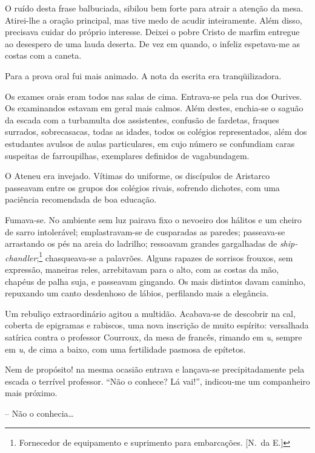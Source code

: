 O ruído desta frase balbuciada,
sibilou bem forte para atrair a atenção da mesa. Atirei{}-lhe a oração
principal, mas tive medo de acudir inteiramente. Além disso, precisava
cuidar do próprio interesse. Deixei o pobre Cristo de marfim entregue
ao desespero de uma lauda deserta. De vez em quando, o infeliz
espetava{}-me as costas com a caneta. 

Para a prova oral fui mais
animado. A nota da escrita era tranqüilizadora. 

Os exames orais eram
todos nas salas de cima. Entrava{}-se pela rua dos Ourives. Os
examinandos estavam em geral mais calmos. Além destes, enchia{}-se o
saguão da escada com a turbamulta dos assistentes, confusão de
fardetas, fraques surrados, sobrecasacas, todas as idades, todos os
colégios representados, além dos estudantes avulsos de aulas
particulares, em cujo número se confundiam caras suspeitas de
farroupilhas, exemplares definidos de vagabundagem. 

O Ateneu era
invejado. Vítimas do uniforme, os discípulos de Aristarco passeavam
entre os grupos dos colégios rivais, sofrendo dichotes, com uma
paciência recomendada de boa educação. 

Fumava{}-se. No ambiente sem luz
pairava fixo o nevoeiro dos hálitos e um cheiro de sarro intolerável;
emplastravam{}-se de cusparadas as paredes; passeava{}-se arrastando os
pés na areia do ladrilho; ressoavam grandes gargalhadas de
\textit{ship{}-chandler};\footnote{ Fornecedor de equipamento e suprimento para embarcações. [N.~da E.]} 
chasqueava{}-se a palavrões. Alguns rapazes de sorrisos 
frouxos, sem expressão, maneiras reles, arrebitavam
para o alto, com as costas da mão, chapéus de palha suja, e passeavam
gingando. Os mais distintos davam caminho, repuxando um canto
desdenhoso de lábios, perfilando mais a elegância. 

Um rebuliço
extraordinário agitou a multidão. Acabava{}-se de descobrir na cal,
coberta de epigramas e rabiscos, uma nova inscrição de muito espírito:
versalhada satírica contra o professor Courroux, da mesa de francês,
rimando em \textit{u}, sempre em \textit{u}, de cima a baixo, com uma fertilidade pasmosa
de epítetos. 

Nem de propósito! na mesma ocasião entrava e lançava{}-se
precipitadamente pela escada o terrível professor. ``Não o conhece? Lá
vai!'', indicou{}-me um companheiro mais próximo. 

-- Não o conhecia\ldots

